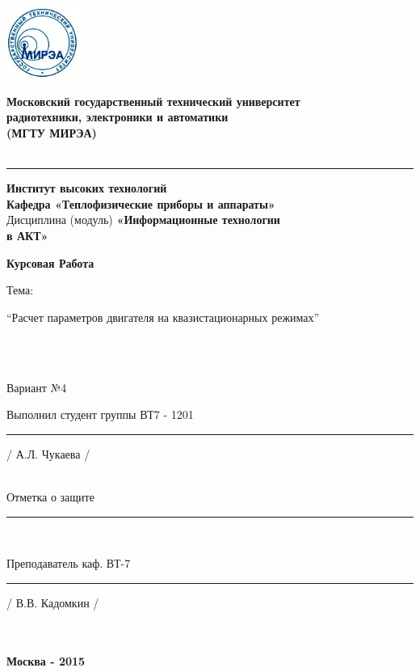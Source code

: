 \documentclass{article}
\begin{document}
\includegraphics[width=2.4cm]{mirea} 
\begin{center}
\begin{LARGE}
\textbf{Московский государственный технический университет}\\
\textbf{радиотехники, электроники и автоматики}\\
\textbf{(МГТУ МИРЭА)} \\
~\\
\hrule \vspace {10pt}
\textbf{Институт высоких технологий} \\

\textbf{Кафедра «Теплофизические приборы и аппараты»} \\
Дисциплина (модуль) \textbf{«Информационные технологии\\
в АКТ»} \\
\end{LARGE}
\begin{Huge}
\textbf{Курсовая Работа}\\
\end{Huge}
\begin{large}
Тема: 
\end{large}
\begin{normalsize}
“Расчет параметров двигателя на квазистационарных режимах” \\
\end{normalsize}
~\\
~\\
\begin{large}
Вариант №4\\

\end{large}
\end{center}
\begin{flushright}
Выполнил студент группы ВТ7 - 1201\\
\rule{4cm}{0.01pt} / А.Л. Чукаева / \\
~\\
\end{flushright}
\begin{flushleft}
Отметка о защите \rule{5cm}{0.01pt} \\
\end{flushleft}
\begin{flushright}

Преподаватель каф. ВТ-7 \\
\rule{4cm}{0.01pt} / В.В. Кадомкин / \\
~\\
~\\
\end{flushright}
\begin{center}
\textbf{Москва - 2015}
\end{center}
\end{document}
